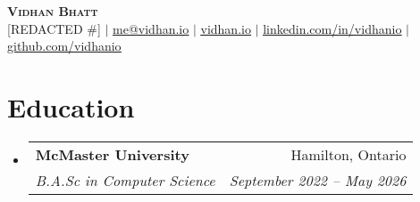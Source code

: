 \documentclass[letterpaper,11pt]{article}
\makeatletter
\newcommand{\resumeItem}[1]{
  \item\small{
    {#1 \vspace{-2pt}}
  }
}
\newcommand{\resumeSubheading}[4]{
  \vspace{-2pt}\item
    \begin{tabular*}{0.97\textwidth}[t]{l@{\extracolsep{\fill}}r}
      \textbf{#1} & #2 \\
      \textit{\small#3} & \textit{\small #4} \\
    \end{tabular*}\vspace{-7pt}
}
\newcommand{\resumeSubSubheading}[2]{
    \item
    \begin{tabular*}{0.97\textwidth}{l@{\extracolsep{\fill}}r}
      \textit{\small#1} & \textit{\small #2} \\
    \end{tabular*}\vspace{-7pt}
}
\newcommand{\resumeSubHeadingListStart}{\begin{itemize}[leftmargin=0.15in, label={}]}
\newcommand{\resumeSubHeadingListEnd}{\end{itemize}}
\newcommand{\resumeItemListStart}{\begin{itemize}}
\newcommand{\resumeItemListEnd}{\end{itemize}\vspace{-5pt}}
\makeatother
\begin{document}

\begin{center}
  \textbf{\Huge \scshape Vidhan Bhatt} \\ \vspace{1pt}
  \small [REDACTED \#] $|$ \href{mailto:me@vidhan.io}{\underline{me@vidhan.io}} $|$
  \href{https://vidhan.io}{\underline{vidhan.io}} $|$
  \href{https://linkedin.com/in/vidhanio}{\underline{linkedin.com/in/vidhanio}} $|$
  \href{https://github.com/vidhanio}{\underline{github.com/vidhanio}}
\end{center}


\section{Education}
\resumeSubHeadingListStart
\resumeSubheading
{McMaster University}{Hamilton, Ontario}
{B.A.Sc in Computer Science}{September 2022 -- May 2026}
\resumeSubHeadingListEnd




\end{document}
